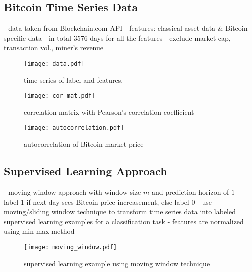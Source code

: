 \subsection{Bitcoin Time Series Data}

- data taken from Blockchain.com API \cite{Data}
- features: classical asset data \& Bitcoin specific data
- in total 3576 days for all the features
- exclude market cap, transaction vol., miner's revenue

\begin{figure}
  \centering
  \texttt{[image: data.pdf]}
  \caption{time series of label and features.}
\end{figure}

\begin{figure}
  \centering
  \texttt{[image: cor\_mat.pdf]}
  \caption{correlation matrix with Pearson's correlation coefficient}
\end{figure}

\begin{figure}
	\centering
	\texttt{[image: autocorrelation.pdf]}
    \caption{autocorrelation of Bitcoin market price}
\end{figure}

\subsection{Supervised Learning Approach}
- moving window approach with window size $m$ and prediction horizon of $1$
- label 1 if next day sees Bitcoin price increasement, else label 0
- use moving/sliding window technique to transform time series data into labeled supervised learning examples for a classification task
- features are normalized using min-max-method

\begin{figure}
	\centering
	\texttt{[image: moving\_window.pdf]}
    \caption{supervised learning example using moving window technique}
\end{figure}